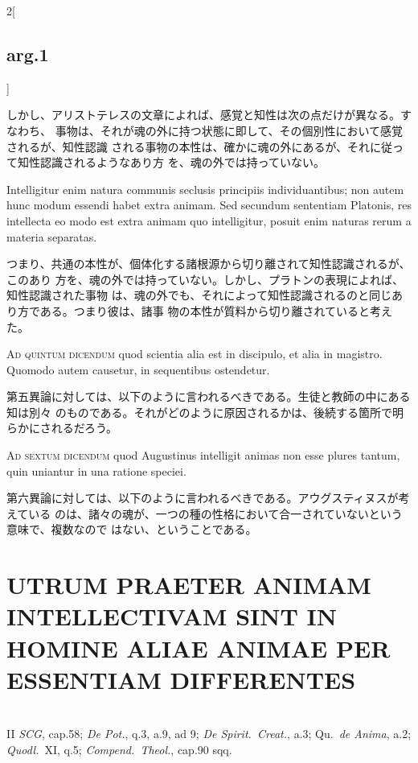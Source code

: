 \documentclass[paper=a4paper,fontsize=10pt,jafontsize=9pt,titlepage]{jlreq}
\begin{document}
\begin{paracol}{2}[\subsection{arg.1}]
\switchcolumn

しかし、アリストテレスの文章によれば、感覚と知性は次の点だけが異なる。すなわち、
事物は、それが魂の外に持つ状態に即して、その個別性において感覚されるが、知性認識
される事物の本性は、確かに魂の外にあるが、それに従って知性認識されるようなあり方
を、魂の外では持っていない。
 
 \switchcolumn
 
 Intelligitur enim natura communis seclusis principiis individuantibus; non
 autem hunc modum essendi habet extra animam. Sed secundum sententiam Platonis,
 res intellecta eo modo est extra animam quo intelligitur, posuit enim naturas
 rerum a materia separatas.

\switchcolumn

つまり、共通の本性が、個体化する諸根源から切り離されて知性認識されるが、このあり
方を、魂の外では持っていない。しかし、プラトンの表現によれば、知性認識された事物
は、魂の外でも、それによって知性認識されるのと同じあり方である。つまり彼は、諸事
物の本性が質料から切り離されていると考えた。
 
\switchcolumn*[\subsection{ad 5}]

{\scshape Ad quintum dicendum} quod scientia alia est in discipulo, et
alia in magistro. Quomodo autem causetur, in sequentibus ostendetur.

\switchcolumn

第五異論に対しては、以下のように言われるべきである。生徒と教師の中にある知は別々
のものである。それがどのように原因されるかは、後続する箇所で明らかにされるだろう。
 
\switchcolumn*[\subsection{ad 6}]

{\scshape Ad sextum dicendum} quod Augustinus intelligit animas non esse plures
tantum, quin uniantur in una ratione speciei.

\switchcolumn

第六異論に対しては、以下のように言われるべきである。アウグスティヌスが考えている
のは、諸々の魂が、一つの種の性格において合一されていないという意味で、複数なので
はない、ということである。

\end{paracol}
\newpage

\section{UTRUM PRAETER ANIMAM INTELLECTIVAM SINT IN HOMINE ALIAE ANIMAE PER ESSENTIAM DIFFERENTES}
\vspace{1em}
\\
{\footnotesize II {\itshape SCG}, cap.58; {\itshape De Pot.}, q.3, a.9, ad 9; {\itshape De Spirit.~Creat.}, a.3; Qu.~{\itshape de Anima}, a.2; {\itshape Quodl.}~XI, q.5; {\itshape Compend.~Theol.}, cap.90 sqq.}\\
\end{document}
